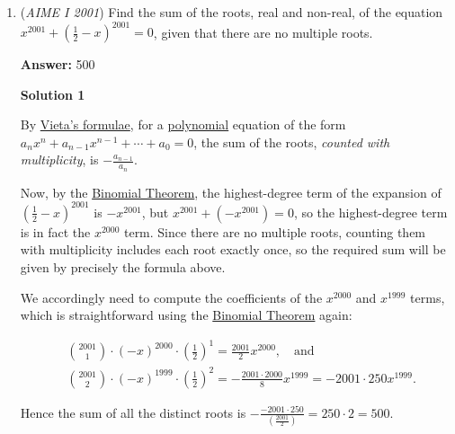 \begin{enumerate}
\textbf{Solution 2}

Since this is a weighted average problem, the mean of $S$ is $\frac{13}{27}$ as far from $1$ as it is from $2001$. Thus, the mean of $S$ is$1 + \frac{13}{13 + 27}(2001 - 1) = \boxed{651}$.

 


	\item (\textit{AIME I 2001}) Find the sum of the roots, real and non-real, of the equation $x^{2001}+\left(\frac 12-x\right)^{2001}=0$, given that there are no multiple roots.


 
 \textbf{Answer: }500



\textbf{Solution 1}

By \href{https://artofproblemsolving.com/wiki/index.php?title=Vieta\%27s\_formulas}{Vieta's formulae}, for a \href{https://artofproblemsolving.com/wiki/index.php?title=Polynomial}{polynomial} equation of the form $a_nx^n + a_{n-1}x^{n-1} + \dotsb + a_0 = 0$, the sum of the roots, \textit{counted with multiplicity}, is $-\frac{a_{n-1}}{a_n}$. 

 Now, by the \href{https://artofproblemsolving.com/wiki/index.php?title=Binomial\_Theorem}{Binomial Theorem}, the highest-degree term of the expansion of $\left(\frac 12-x\right)^{2001}$ is $-x^{2001}$, but $x^{2001}+\left(-x^{2001}\right) = 0$, so the highest-degree term is in fact the $x^{2000}$ term. Since there are no multiple roots, counting them with multiplicity includes each root exactly once, so the required sum will be given by precisely the formula above.

 We accordingly need to compute the coefficients of the $x^{2000}$ and $x^{1999}$ terms, which is straightforward using the \href{https://artofproblemsolving.com/wiki/index.php?title=Binomial\_Theorem}{Binomial Theorem} again:

 
 \begin{align*}&\binom{2001}{1} \cdot (-x)^{2000} \cdot \left(\frac{1}{2}\right)^1 =\frac{2001}{2}x^{2000}, \quad\text{and} \\ &\binom{2001}{2} \cdot (-x)^{1999} \cdot \left(\frac{1}{2}\right)^2 =-\frac{2001 \cdot 2000}{8}x^{1999} = -2001 \cdot 250x^{1999}. \end{align*}


 Hence the sum of all the distinct roots is $-\frac{-2001 \cdot 250}{\left(\frac{2001}{2}\right)} = 250 \cdot 2 = \boxed{500}$.

 




\end{enumerate}
